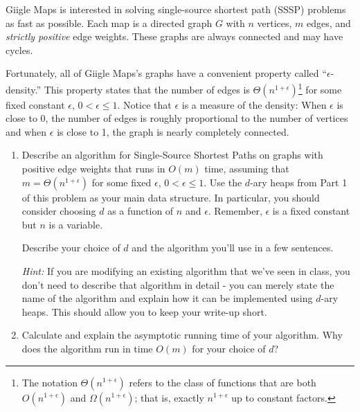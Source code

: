 \documentclass[12 pt, letterpaper]{hmcpset}
\begin{document}
\begin{problem}
	Giigle Maps is interested in solving single-source shortest path (SSSP) problems as fast as possible. Each map is a directed graph $G$ with $n$ vertices, $m$ edges, and \emph{strictly positive} edge weights. These graphs are always connected and may have cycles.
		
Fortunately, all of Giigle Maps's graphs have a convenient property called ``$\epsilon$-density.''  This property states that the number of edges is  $\Theta(n^{1+\epsilon})$\footnote{The notation $\Theta(n^{1+\epsilon})$ refers to the class of functions that are both $O(n^{1+\epsilon})$ and $\Omega(n^{1+\epsilon})$; that is, exactly $n^{1+\epsilon}$ up to constant factors. } for some fixed 
constant $\epsilon$, $0 < \epsilon \leq1$.  Notice that $\epsilon$ is a measure of the density:  When $\epsilon$ is close to 0, the number of edges is roughly proportional to the number of vertices and when $\epsilon$ is close to 1, the graph is nearly completely connected.


\begin{enumerate}
    \item[(d)] Describe an algorithm for Single-Source Shortest Paths on graphs with positive edge weights that runs in $O(m)$ time, assuming that $m = \Theta(n^{1+\epsilon})$ for some fixed $\epsilon$, $0 < \epsilon \leq 1$. Use the $d$-ary heaps from Part 1 of this problem as your main data structure. In particular, you should consider choosing $d$ as a function of $n$ and $\epsilon$. Remember, $\epsilon$ is a fixed constant but $n$ is a variable.
    
    Describe your choice of $d$ and the algorithm you'll use in a few sentences.
    
    \emph{Hint:} If you are modifying an existing algorithm that we've seen in class, you don't need to describe that algorithm in detail - you can merely state the name of the algorithm and explain how it can be implemented using $d$-ary heaps. This should allow you to keep your write-up short.
     
\item[(e)] Calculate and explain the asymptotic running time of your algorithm. Why does the algorithm run in time $O(m)$ for your choice of $d$?
\end{enumerate}
\end{problem}
\end{document}
